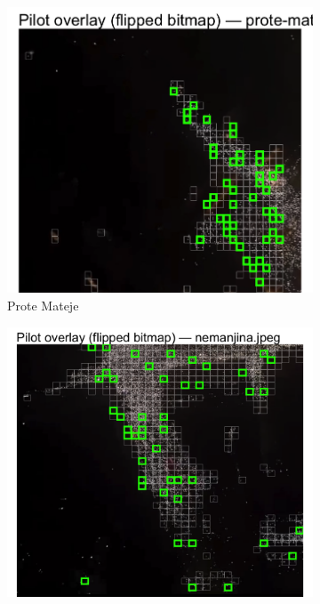\documentclass[a4paper,12pt]{article}
\begin{document}
\begin{figure}[H]
	\centering
  
	\begin{subfigure}[b]{0.3\textwidth}
	  \centering
	  \includegraphics[width=\textwidth]{../outputs/sampling_outputs/plot_overlays_image/pilot_overlay_prote-mateje.png}
	  \caption{Prote Mateje}
	  \label{fig:prote-mateje}
	\end{subfigure}
	\hfill
	\begin{subfigure}[b]{0.3\textwidth}
	  \centering
	  \includegraphics[width=\textwidth]{../outputs/sampling_outputs/plot_overlays_image/pilot_overlay_nemanjina.png}

\end{subfigure}
\end{figure}
\end{document}
